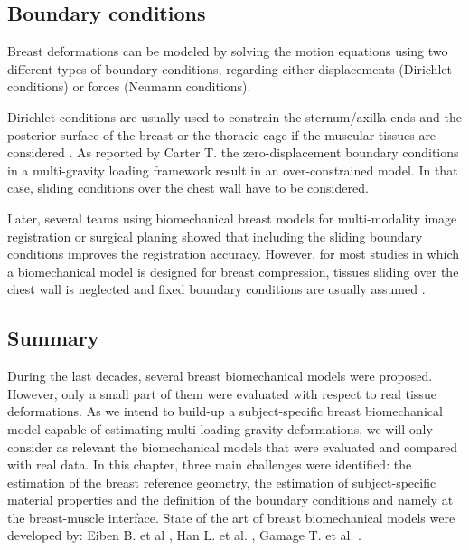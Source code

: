 \subsection{Boundary conditions}

Breast deformations can be modeled by solving the
motion equations using two different types of boundary
conditions, regarding either displacements (Dirichlet conditions) or forces (Neumann conditions).

Dirichlet conditions are usually used to constrain the sternum/axilla ends and the posterior surface of the breast or the thoracic cage if the muscular tissues are considered \citep{griesenauer_breast_2017,rajagopal_creating_2008,pathmanathan_predicting_2008, gamage_modelling_2012,griesenauer_breast_2017}. As reported by Carter T. \citep{carter_biomechanical_2009} the zero-displacement boundary conditions in a multi-gravity loading framework result in an over-constrained model. In that case, sliding conditions over the chest wall have to be considered.    

  Later, several teams using biomechanical breast models for multi-modality image registration or surgical planing showed that including the sliding boundary conditions \citep{georgii_simulation_2016,han_nonlinear_2014}  improves the registration accuracy. However, for most studies in which a biomechanical model is designed for breast compression, tissues sliding over the chest wall is neglected and fixed boundary conditions are usually assumed \citep{sturgeon_finite_element_2016, martinez_finite_2017}.
  
 \subsection{Summary}
 
 During the last decades, several breast biomechanical models were proposed. However, only a small part of them \citep{carter_biomechanical_2009,gamage_modelling_2012,han_nonlinear_2014} were evaluated with respect to real tissue deformations. As we intend to build-up a subject-specific breast biomechanical model capable of estimating multi-loading gravity deformations, we will only consider as relevant the biomechanical models that were evaluated and compared with real data. In this chapter, three main challenges were identified:  the estimation of the breast reference geometry, the estimation of subject-specific material properties and the definition of the boundary conditions and namely at the breast-muscle interface. State of the art of breast biomechanical models were developed by:  Eiben B. et al  \citep{eiben_surface_2016}, Han L. et al. \citep{han_nonlinear_2014}, Gamage T. et al. \citep{gamage_modelling_2012}.   

